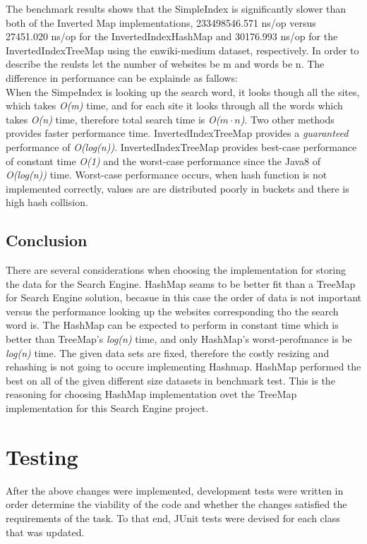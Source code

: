 The benchmark results shows that the SimpleIndex is significantly slower than both of the Inverted Map implementations, 233498546.571 ns/op versus 27451.020 ns/op for the InvertedIndexHashMap and 30176.993 ns/op for the InvertedIndexTreeMap using the enwiki-medium dataset, respectively. 
In order to describe the reulsts let the number of websites be m and words be n. 
The difference in performance can be explainde as fallows: \\
When the SimpeIndex is looking up the search word, it looks though all the sites, which takes \textit{O(m)} time, and for each site it looks through all the words which takes \textit{O(n)} time, therefore total search time is \textit{O($m\cdot n$)}. Two other methods provides faster performance time. InvertedIndexTreeMap provides a  \textit{guaranteed} performance of \textit{O(log(n))}. InvertedIndexTreeMap provides best-case performance of constant time \textit{O(1)} and the worst-case performance since the Java8 of \textit{O(log(n))} time. Worst-case performance occurs, when hash function is not implemented correctly, values are are distributed poorly in buckets and there is high hash collision.



\subsection{Conclusion}
There are several considerations when choosing the implementation for storing the data for the Search Engine. 
HashMap seams to be better fit than a TreeMap for Search Engine solution, becasue in this case the order of data is not important versus the performance looking up the websites corresponding tho the search word is. The HashMap can be expected to perform  in constant time which is better than TreeMap's  \textit{log(n)} time, and only HashMap's worst-perofmance is be \textit{log(n)} time. The given data sets are fixed, therefore the costly resizing and rehashing is not going to occure implementing Hashmap. HashMap performed the best on all of the given different size datasets in benchmark test. This is the reasoning for choosing HashMap implementation ovet the TreeMap implementation for this Search Engine project.



\section{Testing}
After the above changes were implemented, development tests were written in order determine the viability of the code and whether the changes satisfied the requirements of the task. To that end, JUnit tests were devised for each class that was updated.

